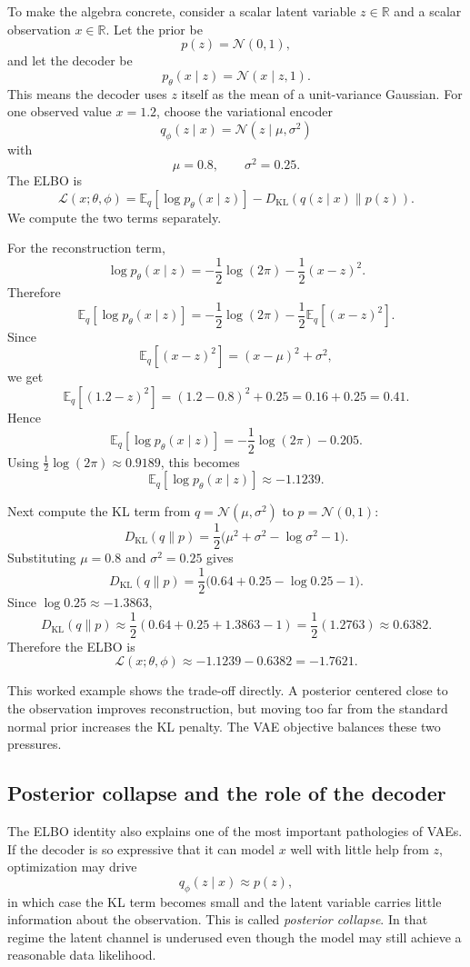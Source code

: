 To make the algebra concrete, consider a scalar latent variable $z\in\mathbb R$ and a scalar observation $x\in\mathbb R$.
Let the prior be
\[
p(z)=\mathcal N(0,1),
\]
and let the decoder be
\[
p_\theta(x\mid z)=\mathcal N(x\mid z,1).
\]
This means the decoder uses $z$ itself as the mean of a unit-variance Gaussian.
For one observed value $x=1.2$, choose the variational encoder
\[
q_\phi(z\mid x)=\mathcal N(z\mid \mu,\sigma^2)
\]
with
\[
\mu=0.8,
\qquad
\sigma^2=0.25.
\]
The ELBO is
\[
\mathcal L(x;\theta,\phi)=\mathbb E_q[\log p_\theta(x\mid z)]-D_{\mathrm{KL}}(q(z\mid x)\|p(z)).
\]
We compute the two terms separately.

For the reconstruction term,
\[
\log p_\theta(x\mid z)=-\frac12\log(2\pi)-\frac12(x-z)^2.
\]
Therefore
\[
\mathbb E_q[\log p_\theta(x\mid z)]
=
-\frac12\log(2\pi)-\frac12\mathbb E_q[(x-z)^2].
\]
Since
\[
\mathbb E_q[(x-z)^2]=(x-\mu)^2+\sigma^2,
\]
we get
\[
\mathbb E_q[(1.2-z)^2]=(1.2-0.8)^2+0.25=0.16+0.25=0.41.
\]
Hence
\[
\mathbb E_q[\log p_\theta(x\mid z)]
=
-\frac12\log(2\pi)-0.205.
\]
Using $\tfrac12\log(2\pi)\approx 0.9189$, this becomes
\[
\mathbb E_q[\log p_\theta(x\mid z)]\approx -1.1239.
\]

Next compute the KL term from $q=\mathcal N(\mu,\sigma^2)$ to $p=\mathcal N(0,1)$:
\[
D_{\mathrm{KL}}(q\|p)=\frac12\bigl(\mu^2+\sigma^2-\log \sigma^2-1\bigr).
\]
Substituting $\mu=0.8$ and $\sigma^2=0.25$ gives
\[
D_{\mathrm{KL}}(q\|p)
=
\frac12\bigl(0.64+0.25-\log 0.25-1\bigr).
\]
Since $\log 0.25\approx -1.3863$,
\[
D_{\mathrm{KL}}(q\|p)
\approx
\frac12(0.64+0.25+1.3863-1)
=
\frac12(1.2763)
\approx 0.6382.
\]
Therefore the ELBO is
\[
\mathcal L(x;\theta,\phi)
\approx
-1.1239-0.6382=-1.7621.
\]

This worked example shows the trade-off directly.
A posterior centered close to the observation improves reconstruction, but moving too far from the standard normal prior increases the KL penalty.
The VAE objective balances these two pressures.

\subsection*{Posterior collapse and the role of the decoder}

The ELBO identity also explains one of the most important pathologies of VAEs.
If the decoder is so expressive that it can model $x$ well with little help from $z$, optimization may drive
\[
q_\phi(z\mid x) \approx p(z),
\]
in which case the KL term becomes small and the latent variable carries little information about the observation.
This is called \emph{posterior collapse}.
In that regime the latent channel is underused even though the model may still achieve a reasonable data likelihood.

